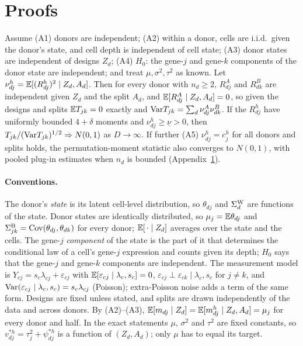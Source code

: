 \section{Proofs}\label{app:proofs}

\begin{theorem}\label{thm:xds}
Assume (A1) donors are independent; (A2) within a donor, cells are i.i.d.\ given the donor's state, and cell depth is independent of cell state; (A3) donor states are independent of designs $Z_d$; (A4) $H_0$: the gene-$j$ and gene-$k$ components of the donor state are independent; and treat $\mu,\sigma^2,\tau^2$ as known. Let $\nu^h_{dj}=\mathbb{E}[(R^h_{dj})^2\mid Z_d,A_d]$. Then for every donor with $n_d\ge2$, $R^A_{dj}$ and $R^B_{dk}$ are independent given $Z_d$ and the split $A_d$, and $\mathbb{E}[R^A_{dj}\mid Z_d,A_d]=0$, so given the designs and splits $\mathbb{E} T_{jk}=0$ exactly and $\mathrm{Var} T_{jk}=\sum_d\nu^A_{dj}\nu^B_{dk}$. If the $R^h_{dj}$ have uniformly bounded $4+\delta$ moments and $\nu^h_{dj}\ge\underline\nu>0$, then $T_{jk}/(\mathrm{Var} T_{jk})^{1/2}\Rightarrow N(0,1)$ as $D\to\infty$. If further (A5) $\nu^h_{dj}=c^h_j$ for all donors and splits holds, the permutation-moment statistic also converges to $N(0,1)$, with pooled plug-in estimates when $n_d$ is bounded (Appendix~\ref{app:proofs}).
\end{theorem}

\paragraph{Conventions.} The donor's \emph{state} is its latent cell-level distribution, so $\theta_{dj}$ and $\Sigma^{\mathrm{W}}_d$ are functions of the state. Donor states are identically distributed, so $\mu_j=\mathbb{E}\theta_{dj}$ and $\Sigma^{\mathrm{B}}_{jk}=\mathrm{Cov}(\theta_{dj},\theta_{dk})$ for every donor; $\mathbb{E}[\,\cdot\mid Z_d]$ averages over the state and the cells. The gene-$j$ \emph{component} of the state is the part of it that determines the conditional law of a cell's gene-$j$ expression and counts given its depth; $H_0$ says that the gene-$j$ and gene-$k$ components are independent. The measurement model is $Y_{cj}=s_c\lambda_{cj}+\varepsilon_{cj}$ with $\mathbb{E}[\varepsilon_{cj}\mid\lambda_c,s_c]=0$, $\varepsilon_{cj}\perp\varepsilon_{ck}\mid\lambda_c,s_c$ for $j\neq k$, and $\mathrm{Var}(\varepsilon_{cj}\mid\lambda_c,s_c)=s_c\lambda_{cj}$ (Poisson); extra-Poisson noise adds a term of the same form. Designs are fixed unless stated, and splits are drawn independently of the data and across donors. By (A2)--(A3), $\mathbb{E}[m_{dj}\mid Z_d]=\mathbb{E}[m^h_{dj}\mid Z_d,A_d]=\mu_j$ for every donor and half. In the exact statements $\mu$, $\sigma^2$ and $\tau^2$ are fixed constants, so $v^{*h}_{dj}=\tau_j^2+\psi^{*h}_{dj}$ is a function of $(Z_d,A_d)$; only $\mu$ has to equal its target.

